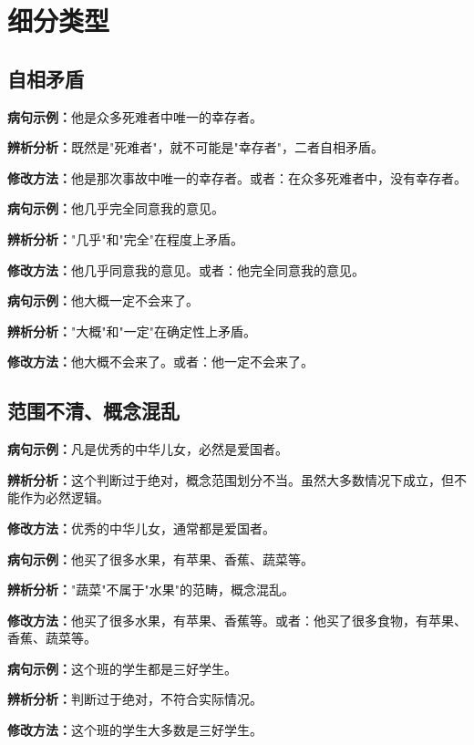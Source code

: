 \documentclass[a4paper,12pt]{ctexrep}
\newcommand{\exampleicon}{\textcolor{highlight}{\faExclamationTriangle}}
\newcommand{\analysisicon}{\textcolor{accent}{\faSearch}}
\newcommand{\revisionicon}{\textcolor{secondary}{\faCheckCircle}}
\begin{document}
\section{细分类型}
\subsection{自相矛盾}
\exampleicon \textbf{病句示例：}他是众多死难者中唯一的幸存者。

\analysisicon \textbf{辨析分析：}既然是"死难者"，就不可能是"幸存者"，二者自相矛盾。

\revisionicon \textbf{修改方法：}他是那次事故中唯一的幸存者。或者：在众多死难者中，没有幸存者。

\exampleicon \textbf{病句示例：}他几乎完全同意我的意见。

\analysisicon \textbf{辨析分析：}"几乎"和"完全"在程度上矛盾。

\revisionicon \textbf{修改方法：}他几乎同意我的意见。或者：他完全同意我的意见。

\exampleicon \textbf{病句示例：}他大概一定不会来了。

\analysisicon \textbf{辨析分析：}"大概"和"一定"在确定性上矛盾。

\revisionicon \textbf{修改方法：}他大概不会来了。或者：他一定不会来了。

\subsection{范围不清、概念混乱}
\exampleicon \textbf{病句示例：}凡是优秀的中华儿女，必然是爱国者。

\analysisicon \textbf{辨析分析：}这个判断过于绝对，概念范围划分不当。虽然大多数情况下成立，但不能作为必然逻辑。

\revisionicon \textbf{修改方法：}优秀的中华儿女，通常都是爱国者。

\exampleicon \textbf{病句示例：}他买了很多水果，有苹果、香蕉、蔬菜等。

\analysisicon \textbf{辨析分析：}"蔬菜"不属于"水果"的范畴，概念混乱。

\revisionicon \textbf{修改方法：}他买了很多水果，有苹果、香蕉等。或者：他买了很多食物，有苹果、香蕉、蔬菜等。

\exampleicon \textbf{病句示例：}这个班的学生都是三好学生。

\analysisicon \textbf{辨析分析：}判断过于绝对，不符合实际情况。

\revisionicon \textbf{修改方法：}这个班的学生大多数是三好学生。
\end{document}
